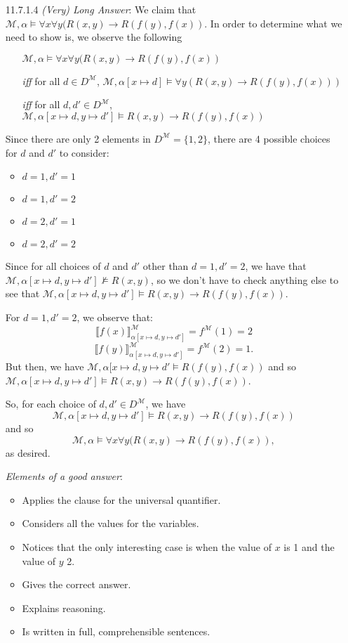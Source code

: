 \begin{itemize}
     \item[11.7.1.4] \emph{(Very) Long Answer}: We claim that $\mathcal{M},\alpha\vDash \forall
       x\forall y(R(x,y)\to R(f(y), f(x))$. In order to determine what
       we need to show is, we observe the following
       \begin{itemize}
       \item[] $\mathcal{M},\alpha\vDash \forall
         x\forall y(R(x,y)\to R(f(y), f(x))$
       \item[\emph{iff}] for all $d\in D^\mathcal{M}$,
         $\mathcal{M},\alpha[x\mapsto d]\vDash \forall y(R(x,y)\to
         R(f(y), f(x)))$
       \item[\emph{iff}] for all $d,d'\in D^\mathcal{M}$,
         $\mathcal{M},\alpha[x\mapsto d, y\mapsto d']\vDash R(x,y)\to
         R(f(y), f(x))$  
       \end{itemize}
      Since there are only 2 elements in $D^\mathcal{M}=\{1,2\}$,
      there are 4 possible choices for $d$ and $d'$ to consider:
      \begin{itemize}
      \item $d=1, d'=1$
      \item $d=1, d'=2$
      \item $d=2, d'=1$
      \item $d=2, d'=2$
      \end{itemize}
      Since for all choices of $d$ and $d'$ other than $d=1, d'=2$, we
      have that $\mathcal{M},\alpha[x\mapsto d, y\mapsto d']\nvDash
      R(x,y)$, so we don't have to check anything else to see that $\mathcal{M},\alpha[x\mapsto d, y\mapsto d']\vDash R(x,y)\to
      R(f(y), f(x))$. 

      For $d=1, d'=2$, we observe that:\[\llbracket
      f(x)\rrbracket^\mathcal{M}_{\alpha[x\mapsto d, y\mapsto
        d']}=f^\mathcal{M}(1)=2\]\[\llbracket
      f(y)\rrbracket^\mathcal{M}_{\alpha[x\mapsto d, y\mapsto
        d']}=f^\mathcal{M}(2)=1.\]
    But then, we have $\mathcal{M}, \alpha[x\mapsto d, y\mapsto
        d'\vDash R(f(y), f(x))$ and so  $\mathcal{M},\alpha[x\mapsto d, y\mapsto d']\vDash R(x,y)\to
      R(f(y), f(x))$.

      So, for each choice of $d,d'\in D^\mathcal{M}$, we have \[\mathcal{M},\alpha[x\mapsto d, y\mapsto d']\vDash R(x,y)\to
      R(f(y), f(x))\] and so \[\mathcal{M},\alpha\vDash \forall
      x\forall y(R(x,y)\to R(f(y), f(x)),\] as desired.

    \emph{Elements of a good answer}:

    \begin{itemize}
    \item Applies the clause for the universal quantifier.
    \item Considers all the values for the variables.
    \item Notices that the only interesting case is when the value of
      $x$ is 1 and the value of $y$ 2.
    \item Gives the correct answer.
    \item Explains reasoning.
    \item Is written in full, comprehensible sentences.
    \end{itemize}


\end{itemize}
